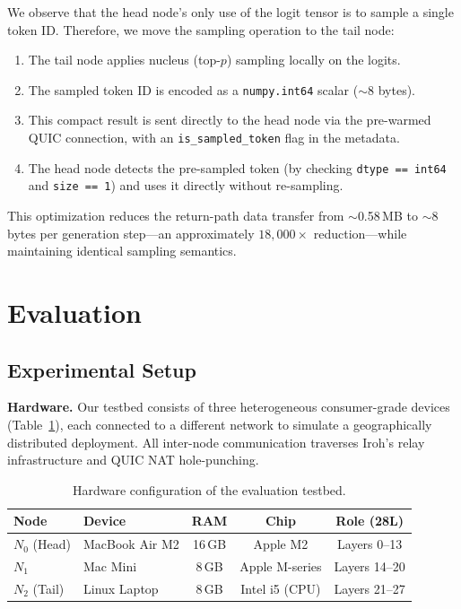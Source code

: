 \documentclass[runningheads]{llncs}
\begin{document}
We observe that the head node's only use of the logit tensor is to sample a single token ID. Therefore, we move the sampling operation to the tail node:

\begin{enumerate}
    \item The tail node applies nucleus (top-$p$) sampling locally on the logits.
    \item The sampled token ID is encoded as a \texttt{numpy.int64} scalar ($\sim$8 bytes).
    \item This compact result is sent directly to the head node via the pre-warmed QUIC connection, with an \texttt{is\_sampled\_token} flag in the metadata.
    \item The head node detects the pre-sampled token (by checking \texttt{dtype == int64} and \texttt{size == 1}) and uses it directly without re-sampling.
\end{enumerate}

This optimization reduces the return-path data transfer from $\sim$0.58\,MB to $\sim$8 bytes per generation step---an approximately $18{,}000\times$ reduction---while maintaining identical sampling semantics.

\section{Evaluation}
\label{sec:eval}

\subsection{Experimental Setup}
\label{sec:setup}

\noindent\textbf{Hardware.} Our testbed consists of three heterogeneous consumer-grade devices (Table~\ref{tab:hardware}), each connected to a different network to simulate a geographically distributed deployment. All inter-node communication traverses Iroh's relay infrastructure and QUIC NAT hole-punching.

\begin{table}[t]
    \centering
    \caption{Hardware configuration of the evaluation testbed.}
    \label{tab:hardware}
    \begin{tabular}{llccc}
    \toprule
    \textbf{Node} & \textbf{Device} & \textbf{RAM} & \textbf{Chip} & \textbf{Role (28L)} \\
    \midrule
    $N_0$ (Head) & MacBook Air M2 & 16\,GB & Apple M2 & Layers 0--13 \\
    $N_1$ & Mac Mini & 8\,GB & Apple M-series & Layers 14--20 \\
    $N_2$ (Tail) & Linux Laptop & 8\,GB & Intel i5 (CPU) & Layers 21--27 \\
    \bottomrule
    \end{tabular}
\end{table}
\end{document}
